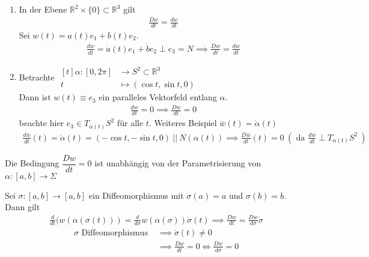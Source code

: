 \documentclass[../main.tex]{subfiles}
\begin{document}
\begin{examples}
\begin{enumerate}
    \item In der Ebene $\mathbb{R}^2 \times \{0\} \subset \mathbb{R}^3$ gilt \begin{align*}
        \frac{Dw}{dt} = \frac{dw}{dt}
    \end{align*}
    Sei $w(t) = a(t)e_1 + b(t)e_2$.
    \begin{align*}
        \frac{dw}{dt} = \dot{a}(t)e_1 + \dot{b}e_2 \perp e_3 = N \implies \frac{Dw}{dt} = \frac{dw}{dt}
    \end{align*}
    
    \item Betrachte $\begin{aligned}[t] \alpha : [0, 2 \pi] & \to S^2 \subset \mathbb{R}^3 \\
    t & \mapsto ( \cos t, \sin t, 0)
    \end{aligned}$ \\
    Dann ist $w(t) \equiv e_3$ ein paralleles Vektorfeld entlang $\alpha$.
    \begin{align*}
        \frac{dw}{dt} = 0 \implies \frac{Dw}{dt} = 0
    \end{align*} beachte hier $e_3 \in T_{\alpha(t)}S^2$ für alle $t$. Weiteres Beispiel $\bar{w}(t) = \dot{\alpha}(t)$ \begin{align*}
        \frac{d \bar{w}}{dt}(t) = \ddot{\alpha}(t) = ( -\cos t, -\sin t, 0) \ || \ N(\alpha(t)) \implies \frac{D\bar{w}}{dt}(t) = 0 \ (\text{ da } \frac{d\bar{w}}{dt} \perp T_{\alpha(t)}S^2 \ )
    \end{align*} 
\end{enumerate}
\end{examples}

\begin{remark}
Die Bedingung $\dfrac{Dw}{dt}=0$ ist unabhängig von der Parametrisierung von $\alpha : [a,b] \to \Sigma $

Sei $\sigma : [a,b] \to [a,b]$ ein Diffeomorphismus mit $\sigma (a) = a$ und $\sigma (b) = b$. Dann gilt
\begin{align*}
    \frac{d}{dt}(w(\alpha(\sigma(t))) = \frac{d}{d\sigma}w(\alpha(\sigma))  \dot{\sigma}(t) \implies \frac{Dw}{dt} = \frac{Dw}{d\sigma}\dot{\sigma}
\end{align*}
\begin{align*}
    \sigma \text{ Diffeomorphismus } & \implies \dot{\sigma}(t) \not = 0 \\
    & \implies \frac{Dw}{dt} = 0 \iff \frac{Dw}{d\sigma} = 0
\end{align*}
\end{remark}
\end{document}
